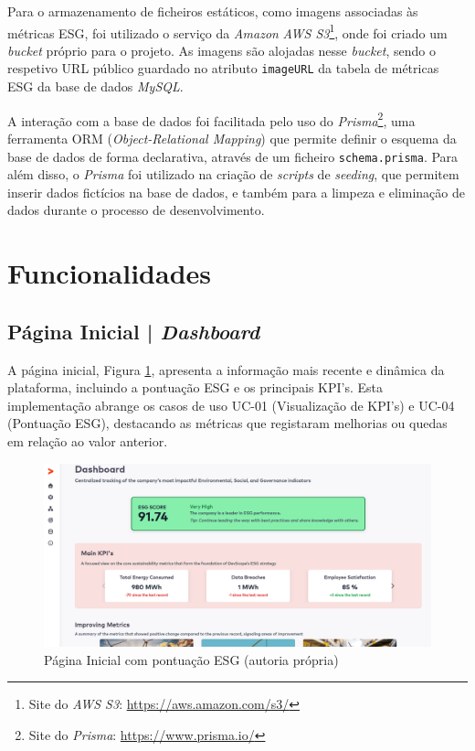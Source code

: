 Para o armazenamento de ficheiros estáticos, como imagens associadas às métricas ESG, foi utilizado o serviço da \textit{Amazon} \textit{AWS S3}\footnote{Site do \textit{AWS S3}: \url{https://aws.amazon.com/s3/}}, onde foi criado um \textit{bucket} próprio para o projeto. As imagens são alojadas nesse \textit{bucket}, sendo o respetivo URL público guardado no atributo \texttt{imageURL} da tabela de métricas ESG da base de dados \textit{MySQL}. 

A interação com a base de dados foi facilitada pelo uso do \textit{Prisma}\footnote{Site do \textit{Prisma}: \url{https://www.prisma.io/}}, uma ferramenta ORM (\textit{Object-Relational Mapping}) que permite definir o esquema da base de dados de forma declarativa, através de um ficheiro \texttt{schema.prisma}. Para além disso, o \textit{Prisma} foi utilizado na criação de \textit{scripts} de \textit{seeding}, que permitem inserir dados fictícios na base de dados, e também para a limpeza e eliminação de dados durante o processo de desenvolvimento.

\section{Funcionalidades}

\subsection{Página Inicial | \textit{Dashboard}}

A página inicial, Figura \ref{fig:homepage}, apresenta a informação mais recente e dinâmica da plataforma, incluindo a pontuação ESG e os principais KPI's. Esta implementação abrange os casos de uso UC-01 (Visualização de KPI's) e UC-04 (Pontuação ESG), destacando as métricas que registaram melhorias ou quedas em relação ao valor anterior.

\begin{figure}[H]
    \centering
    \includegraphics[width=\linewidth,keepaspectratio]{frontmatter/assets/platform_prints/dashboard/dashboard_done.png}
    \caption{Página Inicial com pontuação ESG (autoria própria)}
    \label{fig:homepage}
\end{figure}

